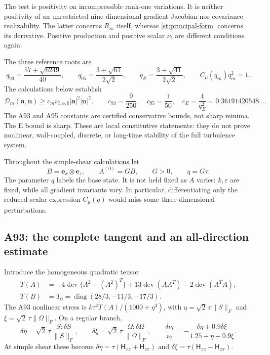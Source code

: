 \documentclass[11pt,a4paper]{article}
\numberwithin{equation}{section}
\newcommand{\eps}{\varepsilon}
\newcommand{\nut}{\nu_t}
\DeclareMathOperator{\dev}{dev}
\DeclareMathOperator{\diag}{diag}
\begin{document}
The test is positivity on incompressible rank-one variations. It is
neither positivity of an unrestricted nine-dimensional gradient
Jacobian nor covariance realizability. The latter concerns $R_m$
itself, whereas \cref{st:principal-form} concerns its derivative.
Positive production and positive scalar $\nut$ are different
conditions again.

The three reference roots are
\begin{equation}
 q_{93}=\frac{57+\sqrt{6249}}{40},\qquad
 q_{95}=\frac{3+\sqrt{61}}{2\sqrt2},\qquad
 q_E=\frac{3+\sqrt{41}}{2\sqrt2},
 \qquad C_\mu(q_m)q_m^2=1.
 \label{st:roots}
\end{equation}
The calculations below establish
\begin{equation}
 \boxed{
 \mathcal D_m(\boldsymbol a,\boldsymbol n)
 \ge c_m\nu_{t,o,0}|\boldsymbol a|^2|\boldsymbol n|^2,\qquad
 c_{93}=\frac9{250},\quad c_{95}=\frac1{50},\quad
 c_E=\frac4{q_E^2}=0.36191420548\ldots .}
 \label{st:reference-bounds}
\end{equation}
The A93 and A95 constants are certified conservative bounds, not sharp
minima. The E bound is sharp. These are local constitutive statements:
they do not prove nonlinear, wall-coupled, discrete, or long-time
stability of the full turbulence system.

Throughout the simple-shear calculations let
\[
 B=\boldsymbol e_x\otimes\boldsymbol e_z,\qquad
 A^{(0)}=GB,\qquad G>0,\qquad q=G\tau .
\]
The parameter $q$ labels the base state. It is not held fixed as $A$
varies: $k,\eps$ are fixed, while all gradient invariants vary.
In particular, differentiating only the reduced scalar expression
$C_\mu(q)$ would miss some three-dimensional perturbations.

\subsection{A93: the complete tangent and an all-direction estimate}
\label{st:a93}

Introduce the homogeneous quadratic tensor
\begin{equation}
 \begin{aligned}
 T(A)&=-4\dev\{A^2+(A^2)^T\}
      +13\dev(AA^T)-2\dev(A^TA),\\
 T(B)&=T_0=\diag(28/3,-11/3,-17/3).
 \end{aligned}
 \label{st:a93-polynomial}
\end{equation}
The A93 nonlinear stress is $k\tau^2T(A)/(1000+\eta^3)$, with
$\eta=\sqrt2\,\tau\|S\|_F$ and
$\xi=\sqrt2\,\tau\|\Omega\|_F$. On a regular branch,
\[
 \delta\eta=\sqrt2\,\tau\,\frac{S:\delta S}{\|S\|_F},
 \qquad
 \delta\xi=\sqrt2\,\tau\,\frac{\Omega:\delta\Omega}{\|\Omega\|_F},
 \qquad
 \frac{\delta\nut}{\nut}
 =-\frac{\delta\eta+0.9\delta\xi}{1.25+\eta+0.9\xi}.
\]
At simple shear these become
$\delta\eta=\tau(\mathsf H_{xz}+\mathsf H_{zx})$ and
$\delta\xi=\tau(\mathsf H_{xz}-\mathsf H_{zx})$.
\end{document}
